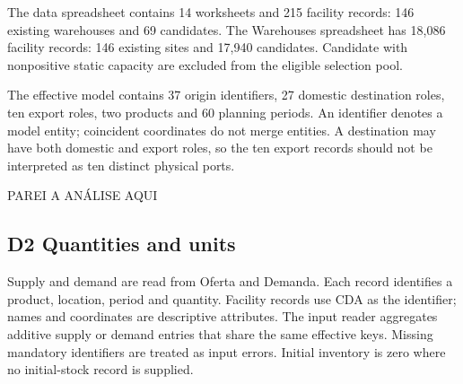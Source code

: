 \documentclass[
  english,
  11pt,
  a4paper,
]{article}
\begin{document}
The data spreadsheet contains 14 worksheets and 215 facility records: 146 existing warehouses and 69 candidates. The Warehouses spreadsheet has 18,086 facility records: 146
existing sites and 17,940 candidates. Candidate with nonpositive static capacity are excluded from the eligible selection pool.

The effective model contains 37 origin identifiers, 27 domestic destination roles, ten export roles, two products and 60 planning periods. An identifier denotes a model entity; coincident coordinates do not merge entities. A destination may have both domestic and export roles, so the ten export records should not be interpreted as ten
distinct physical ports.

PAREI A ANÁLISE AQUI

\subsection{D2 Quantities and units}\label{d2-quantities-and-units}

Supply and demand are read from Oferta and Demanda. Each record
identifies a product, location, period and quantity. Facility records
use CDA as the identifier; names and coordinates are descriptive
attributes. The input reader aggregates additive supply or demand
entries that share the same effective keys. Missing mandatory
identifiers are treated as input errors. Initial inventory is zero where
no initial-stock record is supplied.
\end{document}
